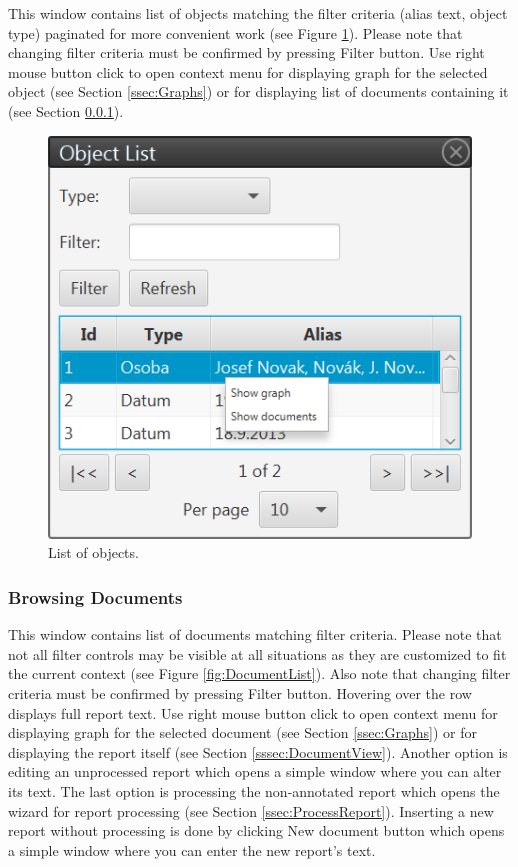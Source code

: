 This window contains list of objects matching the filter criteria (alias text,
object type) paginated for more convenient work (see Figure
\ref{fig:ObjectList}). Please note that changing filter criteria must be confirmed by pressing Filter button. Use right mouse button click to open context menu for displaying graph for the selected object (see Section \ref{ssec:Graphs}) or for displaying list of documents containing it (see
Section \ref{sssec:DocumentList}).

\begin{figure}[!htb]
        \centering
        \includegraphics{Images/objectlist}
        \caption{List of objects.}
        \label{fig:ObjectList}
\end{figure}

\subsubsection{Browsing Documents}
\label{sssec:DocumentList}

This window contains list of documents matching filter criteria. Please note
that not all filter controls may be visible at all situations as they are
customized to fit the current context (see Figure \ref{fig:DocumentList}).
Also note that changing filter criteria must be confirmed by pressing Filter
button. Hovering over the row displays full report text. Use right mouse button
click to open context menu for displaying graph for the selected document (see
Section \ref{ssec:Graphs}) or for displaying the report itself (see Section
\ref{sssec:DocumentView}). Another option is editing an unprocessed report
which opens a simple window where you can alter its text. The last option is
processing the non-annotated report which opens the wizard for report processing
(see Section \ref{ssec:ProcessReport}). Inserting a new report without
processing is done by clicking New document button which opens a simple window
where you can enter the new report's text.


